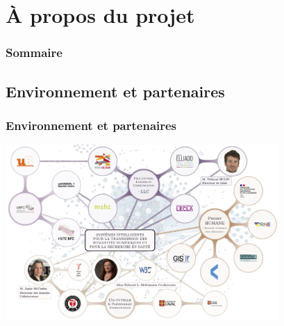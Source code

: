 \documentclass[xcolor=dvipsnames]{beamer}
\begin{document}
\section{À propos du projet}

\begin{frame}
\frametitle{Sommaire}
\tableofcontents[currentsection]
\end{frame}

\subsection{Environnement et partenaires}
\begin{frame}[fragile]
\centering
\frametitle{Environnement et partenaires}
\includegraphics[height = 6.7cm]{images/mindmap.png}
\end{frame}
\end{document}
